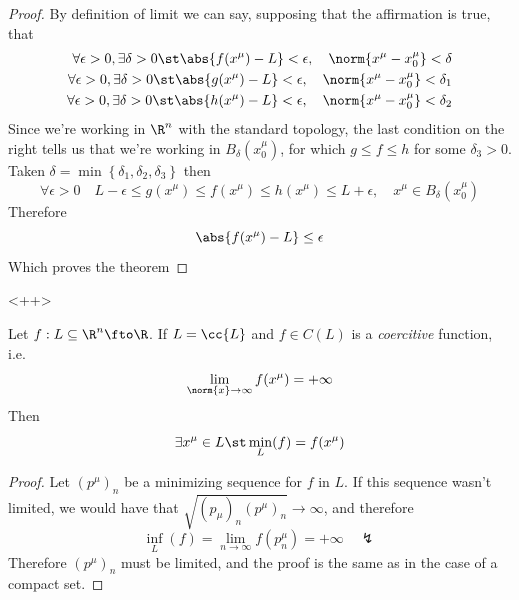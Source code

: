 \documentclass[../mmf.tex]{subfiles}
\begin{document}
\begin{proof}
	By definition of limit we can say, supposing that the affirmation is true, that
	\begin{equation*}
		\begin{aligned}
			\forall\epsilon>0, \exists\delta>0\st\abs{f(x^\mu)-L}<\epsilon,\quad\norm{x^\mu-x^\mu_0}<\delta\\
			\forall\epsilon>0, \exists\delta>0\st\abs{g(x^\mu)-L}<\epsilon,\quad\norm{x^\mu-x^\mu_0}<\delta_1\\
			\forall\epsilon>0, \exists\delta>0\st\abs{h(x^\mu)-L}<\epsilon,\quad\norm{x^\mu-x^\mu_0}<\delta_2\\
		\end{aligned}
	\end{equation*}
	Since we're working in $\R^n$ with the standard topology, the last condition on the right tells us that we're working in $B_\delta(x_0^\mu)$, for which $g\le f\le h$ for some $\delta_3>0$.\\
	Taken $\delta=\min\left\{ \delta_1,\delta_2,\delta_3 \right\}$ then
	\begin{equation*}
		\forall\epsilon>0\quad L-\epsilon\le g(x^\mu)\le f(x^\mu)\le h(x^\mu)\le L+\epsilon,\quad x^\mu\in B_\delta(x^\mu_0)
	\end{equation*}
	Therefore
	\begin{equation*}
		\abs{f(x^\mu)-L}\le\epsilon
	\end{equation*}
	Which proves the theorem
\end{proof}<++>
\begin{thm}
	Let $f:L\subseteq\R^n\fto\R$. If $L=\cc{L}$ and $f\in C(L)$ is a \textit{coercitive} function, i.e.
	\begin{equation}
		\lim_{\norm{x}\to\infty}f(x^\mu)=+\infty
		\label{eq:coercitivef}
	\end{equation}
	Then
	\begin{equation}
		\exists x^\mu\in L\st\min_L(f)=f(x^\mu)
		\label{eq:closedweierstrass}
	\end{equation}
\end{thm}
\begin{proof}
	Let $(p^\mu)_n$ be a minimizing sequence for $f$ in $L$. If this sequence wasn't limited, we would have that $\sqrt{(p_\mu)_n(p^\mu)_n}\to\infty$, and therefore
	\begin{equation*}
		\inf_L(f)=\lim_{n\to\infty}f(p^\mu_n)=+\infty\quad\lightning
	\end{equation*}
	Therefore $(p^\mu)_n$ must be limited, and the proof is the same as in the case of a compact set.
\end{proof}
\end{document}
